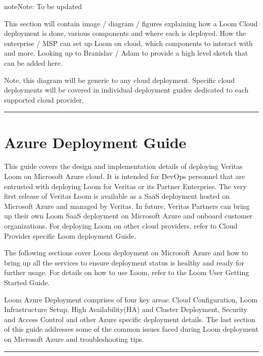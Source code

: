 \documentclass[letterpaper,10pt,english]{sphinxmanual}
\begin{document}
\begin{sphinxadmonition}{note}{Note:}
To be updated

This section will contain image / diagram / figures explaining how a Loom Cloud deployment is done, various components and where each is deployed.  How the enterprise / MSP can set up Loom on cloud, which components to interact with and more.
Looking up to Branislav / Adam to provide a high level sketch that can be added here.

Note, this diagram will be generic to any cloud deployment.  Specific cloud deployments will be covered in individual deployment guides dedicated to each supported cloud provider.
\end{sphinxadmonition}


\bigskip\hrule\bigskip



\section{Azure Deployment Guide}
\label{\detokenize{loom_installation_guide:file-cloud-azure-dep-guide}}\label{\detokenize{loom_installation_guide:azure-deployment-guide}}
This guide covers the design and implementation details of deploying Veritas Loom on Microsoft Azure cloud. It is intended for DevOps personnel that are entrusted with deploying Loom for Veritas or its Partner Enterprise. The very first release of Veritas Loom is  available as a SaaS deployment hosted on Microsoft Azure and managed by Veritas.  In future, Veritas Partners can bring up their own Loom SaaS deployment on Microsoft Azure and onboard customer organizations. For deploying Loom on other cloud providers, refer to Cloud Provider specific Loom deployment Guide.

The following sections cover Loom deployment on Microsoft Azure and how to bring up all the services to ensure deployment status is healthy and ready for further usage.  For details on how to use Loom, refer to the Loom User Getting Started Guide.

Loom Azure Deployment comprises of four key areas:  Cloud Configuration, Loom Infrastructure Setup, High Availability(HA) and Cluster Deployment, Security and Access Control and other Azure specific deployment details. The last section of this guide addresses some of the common issues faced during Loom deployment on Microsoft Azure and troubleshooting tips.


\bigskip\hrule\bigskip
\end{document}
